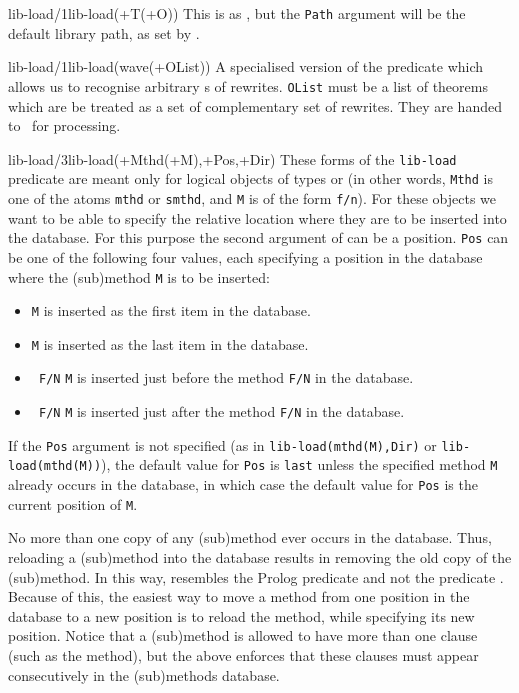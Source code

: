 \begin{predicate}{lib-load/1}{lib-load(+T(+O))}%
This is as , but the {\tt Path} argument will be the
default library path, as set by .
\end{predicate}

\begin{predicate}{lib-load/1}{lib-load(wave(+OList))}%
A specialised version of the  predicate which allows us to
recognise arbitrary s of rewrites.  {\tt OList}
must be a list of theorems which are be treated as a set of
complementary set of rewrites.  They are handed
to~ for processing.
\end{predicate}

\begin{predicate}{lib-load/3}{lib-load(+Mthd(+M),+Pos,+Dir)}%
These forms of the {\tt lib-load} predicate are meant only for logical
objects of types {\tt{}} or {\tt {}} (in other words,
{\tt Mthd} is one of the atoms {\tt mthd} or {\tt smthd}, and
{\tt M} is of the form {\tt f/n}). For these objects we want to be able to
specify the relative location where they are to be inserted into the
database. For this purpose the second argument of 
can be a position. {\tt Pos} can be one of the following four values,
each specifying a position in the database where the (sub)method
{\tt M} is to be inserted: 
\begin{itemize}
\item {\tt {}}
{\tt M} is inserted as the first item in the database.
\item {\tt {}}
{\tt M} is inserted as the last item in the database.
\item {\tt {} F/N}
{\tt M} is inserted just before the method {\tt F/N} in the database.
\item {\tt {} F/N}
{\tt M} is inserted just after the method {\tt F/N} in the database.
\end{itemize}
If the {\tt Pos} argument is not specified (as in
{\tt lib-load(mthd(M),Dir)} or {\tt lib-load(mthd(M))}), the default
value for {\tt Pos} is {\tt last} unless the specified method {\tt M}
already occurs in the database, in which case the default value for
{\tt Pos} is the current position of {\tt M}.

No more than one copy of any (sub)method ever occurs in the database.
Thus, reloading a (sub)method into the database results in removing
the old copy of the (sub)method. In this way, 
resembles the Prolog predicate  and not the predicate
. Because of this, the easiest way to move a method from
one position in the database to a new position is to reload the
method, while specifying its new position.
Notice that a (sub)method is allowed to have more than one clause
(such as the  method), but the above enforces that these
clauses must appear consecutively in the (sub)methods database.


\end{predicate}
